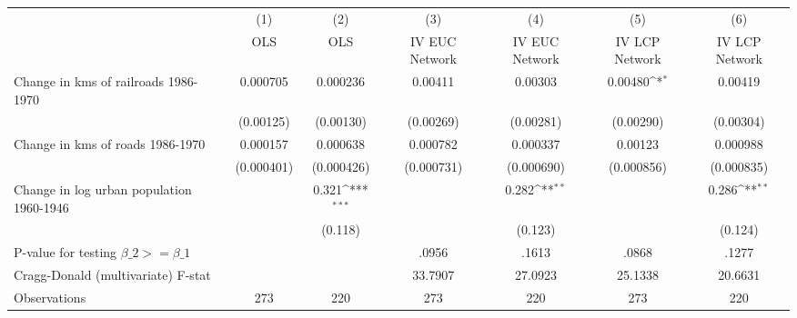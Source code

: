 {
\def\sym#1{\ifmmode^{#1}\else\(^{#1}\)\fi}
\begin{tabular}{l*{6}{c}}
\hline\hline
                &\multicolumn{1}{c}{(1)}&\multicolumn{1}{c}{(2)}&\multicolumn{1}{c}{(3)}&\multicolumn{1}{c}{(4)}&\multicolumn{1}{c}{(5)}&\multicolumn{1}{c}{(6)}\\
                &\multicolumn{1}{c}{OLS}&\multicolumn{1}{c}{OLS}&\multicolumn{1}{c}{IV EUC Network}&\multicolumn{1}{c}{IV EUC Network}&\multicolumn{1}{c}{IV LCP Network}&\multicolumn{1}{c}{IV LCP Network}\\
\hline
Change in kms of railroads 1986-1970& 0.000705         & 0.000236         &  0.00411         &  0.00303         &  0.00480\sym{*}  &  0.00419         \\
                &(0.00125)         &(0.00130)         &(0.00269)         &(0.00281)         &(0.00290)         &(0.00304)         \\
[1em]
Change in kms of roads 1986-1970& 0.000157         & 0.000638         & 0.000782         & 0.000337         &  0.00123         & 0.000988         \\
                &(0.000401)         &(0.000426)         &(0.000731)         &(0.000690)         &(0.000856)         &(0.000835)         \\
[1em]
Change in log urban population 1960-1946&                  &    0.321\sym{***}&                  &    0.282\sym{**} &                  &    0.286\sym{**} \\
                &                  &  (0.118)         &                  &  (0.123)         &                  &  (0.124)         \\
\hline
P-value for testing $\beta\_{2} >= \beta\_{1}$&                  &                  &    .0956         &    .1613         &    .0868         &    .1277         \\
Cragg-Donald (multivariate) F-stat&                  &                  &  33.7907         &  27.0923         &  25.1338         &  20.6631         \\
Observations    &      273         &      220         &      273         &      220         &      273         &      220         \\
\hline\hline
\end{tabular}
}
